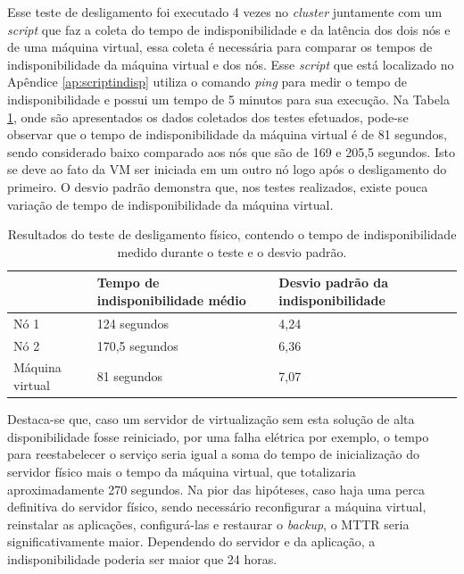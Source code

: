 Esse teste de desligamento foi executado 4 vezes no \textit{cluster} juntamente com um \textit{script} que faz a coleta do tempo de
indisponibilidade e da latência dos dois nós e de uma máquina virtual, essa coleta é necessária para comparar os tempos de indisponibilidade da
máquina virtual e dos nós. 
Esse \textit{script} que está localizado no Apêndice \ref{ap:scriptindisp} utiliza o comando \textit{ping} para medir o tempo de indisponibilidade 
e possui um tempo de 5 minutos para sua execução. Na Tabela \ref{tab:teste1resultados}, onde são apresentados os dados coletados dos testes 
efetuados, pode-se observar que o tempo de indisponibilidade da máquina virtual é de 81 segundos, sendo considerado baixo comparado aos nós 
que são de 169 e 205,5 segundos. Isto se deve ao fato da \ac{VM} ser iniciada em um outro nó logo após o desligamento do primeiro. 
O desvio padrão demonstra que, nos testes realizados, existe pouca variação de tempo de indisponibilidade da máquina virtual.


\begin{table}[h!]
\caption{Resultados do teste de desligamento físico, contendo o tempo de indisponibilidade medido durante o teste e o desvio padrão.}
\label{tab:teste1resultados}
\begin{center}
\begin{tabular}{|l|l|l|}\hline
 & \textbf{Tempo de indisponibilidade médio} & \textbf{Desvio padrão da indisponibilidade} \\\hline
Nó 1 & 124 segundos & 4,24 \\\hline
Nó 2 & 170,5 segundos & 6,36 \\\hline
Máquina virtual & 81 segundos & 7,07 \\\hline
\end{tabular}
\end{center}
\end{table}

Destaca-se que, caso um servidor de virtualização sem esta solução de alta disponibilidade fosse reiniciado, por uma falha elétrica por exemplo, 
o tempo para reestabelecer o serviço seria igual a soma do tempo de inicialização do servidor físico mais o tempo da máquina virtual, 
que totalizaria aproximadamente 270 segundos. 
Na pior das hipóteses, caso haja uma perca definitiva do servidor físico, sendo necessário reconfigurar a máquina virtual, reinstalar as aplicações,
configurá-las e restaurar o \textit{backup}, o \ac{MTTR} seria significativamente maior. Dependendo do servidor e da aplicação, 
a indisponibilidade poderia ser maior que 24 horas.

